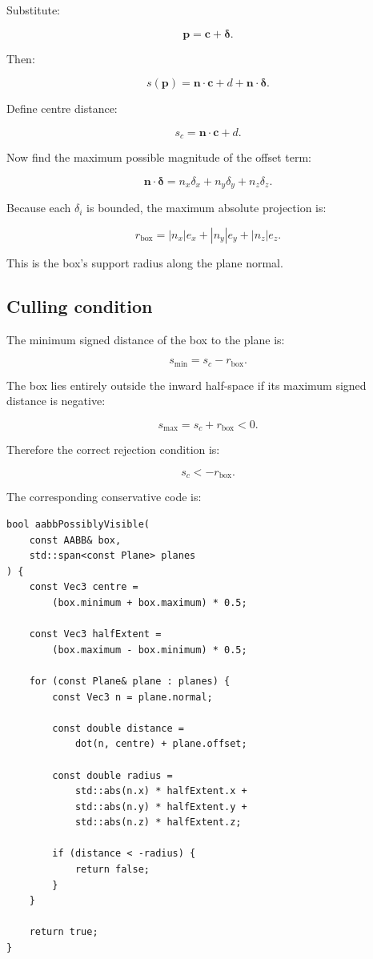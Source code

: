 Substitute:

\[
 \mathbf p=\mathbf c+\boldsymbol\delta.
\]

Then:

\[
 s(\mathbf p)= \mathbf n\cdot\mathbf c+d+ \mathbf n\cdot\boldsymbol\delta.
\]

Define centre distance:

\[
 \boxed{ s_c=\mathbf n\cdot\mathbf c+d }.
\]

Now find the maximum possible magnitude of the offset term:

\[
 \mathbf n\cdot\boldsymbol\delta = n_x\delta_x+n_y\delta_y+n_z\delta_z.
\]

Because each \(\delta_i\) is bounded, the maximum absolute projection is:

\[
 \boxed{ r_{\mathrm{box}}= |n_x|e_x+|n_y|e_y+|n_z|e_z }.
\]

This is the box's support radius along the plane normal.

\subsection{Culling condition}\label{02-foundations-ii-ch034-culling-condition}

\hypertarget{02-foundations-ii-ch034-culling-condition}{}

The minimum signed distance of the box to the plane is:

\[
 s_{\min}=s_c-r_{\mathrm{box}}.
\]

The box lies entirely outside the inward half-space if its maximum signed distance is negative:

\[
 s_{\max}=s_c+r_{\mathrm{box}}<0.
\]

Therefore the correct rejection condition is:

\[
 \boxed{ s_c<-r_{\mathrm{box}} }.
\]

The corresponding conservative code is:

\begin{verbatim}
bool aabbPossiblyVisible(
    const AABB& box,
    std::span<const Plane> planes
) {
    const Vec3 centre =
        (box.minimum + box.maximum) * 0.5;

    const Vec3 halfExtent =
        (box.maximum - box.minimum) * 0.5;

    for (const Plane& plane : planes) {
        const Vec3 n = plane.normal;

        const double distance =
            dot(n, centre) + plane.offset;

        const double radius =
            std::abs(n.x) * halfExtent.x +
            std::abs(n.y) * halfExtent.y +
            std::abs(n.z) * halfExtent.z;

        if (distance < -radius) {
            return false;
        }
    }

    return true;
}
\end{verbatim}

